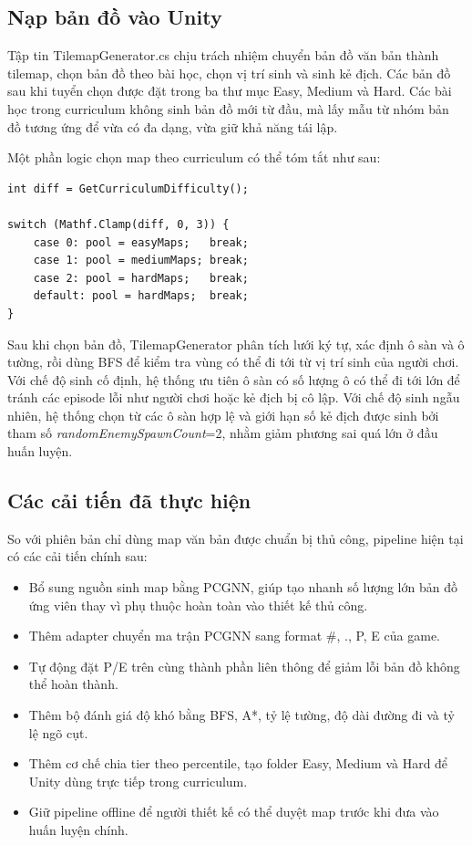 \subsection{Nạp bản đồ vào Unity}

Tập tin TilemapGenerator.cs chịu trách nhiệm chuyển bản đồ văn bản thành tilemap, chọn bản đồ theo bài học, chọn vị trí sinh và sinh kẻ địch. Các bản đồ sau khi tuyển chọn được đặt trong ba thư mục Easy, Medium và Hard. Các bài học trong curriculum không sinh bản đồ mới từ đầu, mà lấy mẫu từ nhóm bản đồ tương ứng để vừa có đa dạng, vừa giữ khả năng tái lập.

Một phần logic chọn map theo curriculum có thể tóm tắt như sau:

\begin{lstlisting}
int diff = GetCurriculumDifficulty();

switch (Mathf.Clamp(diff, 0, 3)) {
    case 0: pool = easyMaps;   break;
    case 1: pool = mediumMaps; break;
    case 2: pool = hardMaps;   break;
    default: pool = hardMaps;  break;
}
\end{lstlisting}

Sau khi chọn bản đồ, TilemapGenerator phân tích lưới ký tự, xác định ô sàn và ô tường, rồi dùng BFS để kiểm tra vùng có thể đi tới từ vị trí sinh của người chơi. Với chế độ sinh cố định, hệ thống ưu tiên ô sàn có số lượng ô có thể đi tới lớn để tránh các episode lỗi như người chơi hoặc kẻ địch bị cô lập. Với chế độ sinh ngẫu nhiên, hệ thống chọn từ các ô sàn hợp lệ và giới hạn số kẻ địch được sinh bởi tham số \emph{randomEnemySpawnCount}=2, nhằm giảm phương sai quá lớn ở đầu huấn luyện.

\subsection{Các cải tiến đã thực hiện}

So với phiên bản chỉ dùng map văn bản được chuẩn bị thủ công, pipeline hiện tại có các cải tiến chính sau:

\begin{itemize}
    \item Bổ sung nguồn sinh map bằng PCGNN, giúp tạo nhanh số lượng lớn bản đồ ứng viên thay vì phụ thuộc hoàn toàn vào thiết kế thủ công.
    \item Thêm adapter chuyển ma trận PCGNN sang format \#, ., P, E của game.
    \item Tự động đặt P/E trên cùng thành phần liên thông để giảm lỗi bản đồ không thể hoàn thành.
    \item Thêm bộ đánh giá độ khó bằng BFS, A*, tỷ lệ tường, độ dài đường đi và tỷ lệ ngõ cụt.
    \item Thêm cơ chế chia tier theo percentile, tạo folder Easy, Medium và Hard để Unity dùng trực tiếp trong curriculum.
    \item Giữ pipeline offline để người thiết kế có thể duyệt map trước khi đưa vào huấn luyện chính.
\end{itemize}

